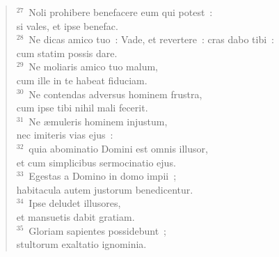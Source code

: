 \begin{flushleft}\begin{verse}${}^{27}$~Noli prohibere benefacere eum qui potest~:\\ si vales, et ipse benefac.\\
${}^{28}$~Ne dicas amico tuo~: Vade, et revertere~: cras dabo tibi~:\\ cum statim possis dare.\\
${}^{29}$~Ne moliaris amico tuo malum,\\ cum ille in te habeat fiduciam.\\
${}^{30}$~Ne contendas adversus hominem frustra,\\ cum ipse tibi nihil mali fecerit.\\
${}^{31}$~Ne \ae muleris hominem injustum,\\ nec imiteris vias ejus~:\\
${}^{32}$~quia abominatio Domini est omnis illusor,\\ et cum simplicibus sermocinatio ejus.\\
${}^{33}$~Egestas a Domino in domo impii~;\\ habitacula autem justorum benedicentur.\\
${}^{34}$~Ipse deludet illusores,\\ et mansuetis dabit gratiam.\\
${}^{35}$~Gloriam sapientes possidebunt~;\\ stultorum exaltatio ignominia.\end{verse}\end{flushleft}



